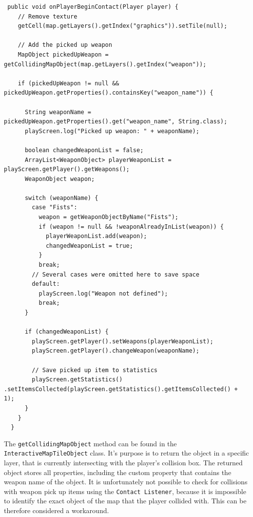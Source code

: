 \documentclass[12p]{article}
\begin{document}
\begin{verbatim}
 public void onPlayerBeginContact(Player player) {
    // Remove texture
    getCell(map.getLayers().getIndex("graphics")).setTile(null);

    // Add the picked up weapon
    MapObject pickedUpWeapon = getCollidingMapObject(map.getLayers().getIndex("weapon"));
    
    if (pickedUpWeapon != null && pickedUpWeapon.getProperties().containsKey("weapon_name")) {
    
      String weaponName = pickedUpWeapon.getProperties().get("weapon_name", String.class);
      playScreen.log("Picked up weapon: " + weaponName);

      boolean changedWeaponList = false;
      ArrayList<WeaponObject> playerWeaponList = playScreen.getPlayer().getWeapons();
      WeaponObject weapon;
      
      switch (weaponName) {
        case "Fists":
          weapon = getWeaponObjectByName("Fists");
          if (weapon != null && !weaponAlreadyInList(weapon)) {
            playerWeaponList.add(weapon);
            changedWeaponList = true;
          }
          break;
        // Several cases were omitted here to save space
        default:
          playScreen.log("Weapon not defined");
          break;
      }

      if (changedWeaponList) {
        playScreen.getPlayer().setWeapons(playerWeaponList);
        playScreen.getPlayer().changeWeapon(weaponName);

        // Save picked up item to statistics
        playScreen.getStatistics() .setItemsCollected(playScreen.getStatistics().getItemsCollected() + 1);
      }
    }
  }
\end{verbatim}
 
The \texttt{getCollidingMapObject} method can be found in the \texttt{InteractiveMapTileObject} class. It's purpose is to return the object in a specific layer, that is currently intersecting with the player's collision box. The returned object stores all properties, including the custom property that contains the weapon name of the object. It is unfortunately not possible to check for collisions with weapon pick up items using the \texttt{Contact Listener}, because it is impossible to identify the exact object of the map that the player collided with. This can be therefore considered a workaround.
 
\end{document}

